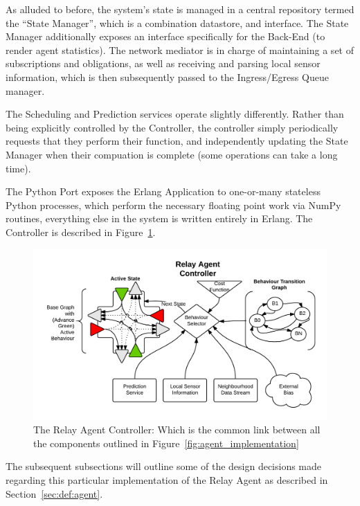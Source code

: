 \documentclass{report}
\begin{document}
As alluded to before, the system's state is managed in a central repository termed the ``State Manager'', which is a combination datastore, and interface.
The State Manager additionally exposes an interface specifically for the Back-End (to render agent statistics).
The network mediator is in charge of maintaining a set of subscriptions and obligations, as well as receiving and parsing local sensor information, which is then subsequently passed to the Ingress/Egress Queue manager.

The Scheduling and Prediction services operate slightly differently.
Rather than being explicitly controlled by the Controller, the controller simply periodically requests that they perform their function, and independently updating the State Manager when their compuation is complete (some operations can take a long time).

The Python Port exposes the Erlang Application to one-or-many stateless Python processes, which perform the necessary floating point work via NumPy routines, everything else in the system is written entirely in Erlang. The Controller is described in Figure~\ref{fig:agent_controller}.

\begin{figure}\label{fig:agent_controller}
	\includegraphics[width=\textwidth]{figures/Relay_Agent_Controller.png}
	\caption{The Relay Agent Controller: Which is the common link between all the components outlined in Figure~\ref{fig:agent_implementation}}
\end{figure}

The subsequent subsections will outline some of the design decisions made regarding this particular implementation of the Relay Agent as described in Section~\ref{sec:def:agent}.
\end{document}
